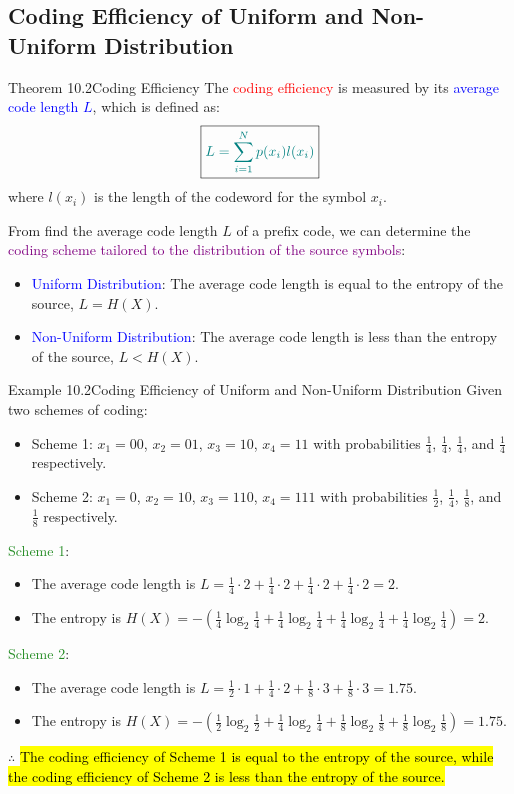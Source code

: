 \documentclass{book}
\begin{document}
\subsection{Coding Efficiency of Uniform and Non-Uniform Distribution}
\begin{thmBox}{Theorem 10.2}{Coding Efficiency}
    The \textcolor{red}{coding efficiency} is measured by its \textcolor{blue}{average code length $L$}, which is defined as:
    \[
        \boxed{\textcolor{teal}{L = \sum_{i=1}^{N} p(x_i) l(x_i)}}
    \]
    where $l(x_i)$ is the length of the codeword for the symbol $x_i$.
\end{thmBox}
From find the average code length $L$ of a prefix code, we can determine the \textcolor{purple}{coding scheme tailored to the distribution of the source symbols}:
\begin{itemize}
    \item \textcolor{blue}{Uniform Distribution}: The average code length is equal to the entropy of the source, $L = H(X)$.
    \item \textcolor{blue}{Non-Uniform Distribution}: The average code length is less than the entropy of the source, $L < H(X)$.
\end{itemize}
\begin{egBox}{Example 10.2}{Coding Efficiency of Uniform and Non-Uniform Distribution}
    Given two schemes of coding:
    \begin{itemize}
        \item Scheme 1: $x_1 = 00$, $x_2 = 01$, $x_3 = 10$, $x_4 = 11$ with probabilities $\frac{1}{4}$, $\frac{1}{4}$, $\frac{1}{4}$, and $\frac{1}{4}$ respectively.
        \item Scheme 2: $x_1 = 0$, $x_2 = 10$, $x_3 = 110$, $x_4 = 111$ with probabilities $\frac{1}{2}$, $\frac{1}{4}$, $\frac{1}{8}$, and $\frac{1}{8}$ respectively.
    \end{itemize}
    \textcolor{forestgreen}{Scheme 1}:
    \begin{itemize}
        \item The average code length is $L = \frac{1}{4} \cdot 2 + \frac{1}{4} \cdot 2 + \frac{1}{4} \cdot 2 + \frac{1}{4} \cdot 2 = 2$.
        \item The entropy is $H(X) = -\left(\frac{1}{4} \log_2 \frac{1}{4} + \frac{1}{4} \log_2 \frac{1}{4} + \frac{1}{4} \log_2 \frac{1}{4} + \frac{1}{4} \log_2 \frac{1}{4}\right) = 2$.
    \end{itemize}
    \textcolor{forestgreen}{Scheme 2}:
    \begin{itemize}
        \item The average code length is $L = \frac{1}{2} \cdot 1 + \frac{1}{4} \cdot 2 + \frac{1}{8} \cdot 3 + \frac{1}{8} \cdot 3 = 1.75$.
        \item The entropy is $H(X) = -\left(\frac{1}{2} \log_2 \frac{1}{2} + \frac{1}{4} \log_2 \frac{1}{4} + \frac{1}{8} \log_2 \frac{1}{8} + \frac{1}{8} \log_2 \frac{1}{8}\right) = 1.75$.
    \end{itemize}
    $\therefore$ \hl{The coding efficiency of Scheme 1 is equal to the entropy of the source, while the coding efficiency of Scheme 2 is less than the entropy of the source.}
\end{egBox}
\end{document}
